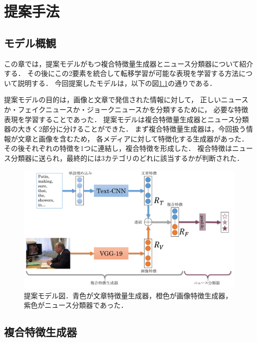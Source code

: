 %
\chapter{提案手法}
%
\section{モデル概観}
この章では，提案モデルがもつ複合特徴量生成器とニュース分類器について紹介する．
その後にこの2要素を統合して転移学習が可能な表現を学習する方法について説明する．
今回提案したモデルは，以下の図\ref{fig:model}の通りである．

提案モデルの目的は，画像と文章で発信された情報に対して，
正しいニュースか・フェイクニュースか・ジョークニュースかを分類するために，
必要な特徴表現を学習することであった．
提案モデルは複合特徴量生成器とニュース分類器の大きく2部分に分けることができた．
まず複合特徴量生成器は，今回扱う情報が文章と画像を含むため，
各メディアに対して特徴化する生成器があった．
その後それぞれの特徴を1つに連結し，複合特徴を形成した．
複合特徴はニュース分類器に送られ，最終的には3カテゴリのどれに該当するかが判断された．
% 
\begin{figure}[H]
    \centering
    \includegraphics[width=\linewidth]{images/methodology.pdf}
    \caption{提案モデル図．青色が文章特徴量生成器，橙色が画像特徴生成器，紫色がニュース分類器であった．}
    \label{fig:model}
\end{figure}
%
\section{複合特徴生成器}
%
